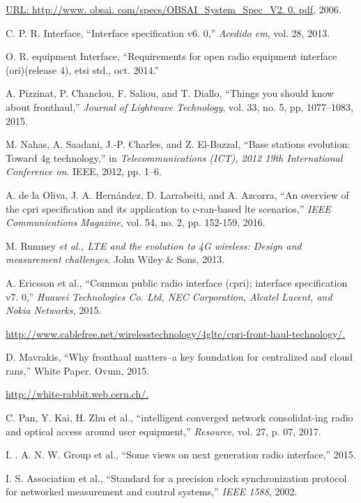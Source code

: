 \begin{multicols}{2}
\begin{thebibliography}{99}
\url{URL: http://www. obsai. com/specs/OBSAI_System_Spec_V2. 0. pdf}, 2006.

 C. P. R. Interface, “Interface specification v6. 0,” \textit{Acedido em}, vol. 28, 2013.

 O. R. equipment Interface, “Requirements for open radio equipment interface (ori)(release 4), etsi std., oct. 2014.”

 A. Pizzinat, P. Chanclou, F. Saliou, and T. Diallo, “Things you should know about fronthaul,” \textit{Journal of Lightwave Technology}, vol. 33, no. 5, pp. 1077–1083, 2015.

 M. Nahas, A. Saadani, J.-P. Charles, and Z. El-Bazzal, “Base stations evolution: Toward 4g technology,” in \textit{Telecommunications (ICT), 2012 19th International Conference on}. IEEE, 2012, pp. 1–6. 

 A. de la Oliva, J. A. Hernández, D. Larrabeiti, and A. Azcorra, “An overview of the cpri specification and its application to c-ran-based lte scenarios,” \textit{IEEE Communications Magazine}, vol. 54, no. 2, pp. 152-159, 2016.

 M. Rumney \textit{et al., LTE and the evolution to 4G wireless: Design and measurement challenges}. John Wiley \& Sons, 2013.

 A. Ericsson et al., “Common public radio interface (cpri); interface specification v7. 0,” \textit{Huawei Technologies Co. Ltd, NEC Corporation, Alcatel Lucent, and Nokia Networks,} 2015.

\url{http://www.cablefree.net/wirelesstechnology/4glte/cpri-front-haul-technology/.}

 D. Mavrakis, “Why fronthaul matters–a key foundation for centralized and cloud rans,” White Paper. Ovum, 2015.

\url{http://white-rabbit.web.cern.ch/.}

 C. Pan, Y. Kai, H. Zhu et al., “intelligent converged network consolidat-ing radio and optical access around user equipment,” \textit{Resource}, vol. 27, p. 07, 2017.

 I. . A. N. W. Group et al., “Some views on next generation radio interface,” 2015.

 I. S. Association et al., “Standard for a precision clock synchronization protocol for networked measurement and control systems,” \textit{IEEE 1588}, 2002.


\end{thebibliography}
\end{multicols}
